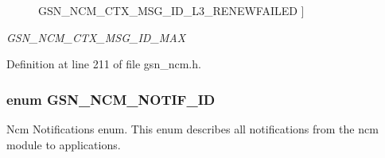 \begin{Desc}
\begin{description}
{\hypertarget{a00688_gga7df8ae3172682e89bfa663208e3f0081a997c45d4f40178db905d5099db419071}{
GSN\_\-NCM\_\-CTX\_\-MSG\_\-ID\_\-L3\_\-RENEWFAILED}
\label{a00688_gga7df8ae3172682e89bfa663208e3f0081a997c45d4f40178db905d5099db419071}
}]\item[{\em 
\hypertarget{a00688_gga7df8ae3172682e89bfa663208e3f0081a69add9c8fa35762c0fc5614ee77eaab3}{
GSN\_\-NCM\_\-CTX\_\-MSG\_\-ID\_\-MAX}
\label{a00688_gga7df8ae3172682e89bfa663208e3f0081a69add9c8fa35762c0fc5614ee77eaab3}
}]\end{description}
\end{Desc}



Definition at line 211 of file gsn\_\-ncm.h.

\hypertarget{a00688_ga9e3bfe0ed58e26633d51d10250743b2a}{
\subsubsection[{GSN\_\-NCM\_\-NOTIF\_\-ID}]{\setlength{\rightskip}{0pt plus 5cm}enum {\bf GSN\_\-NCM\_\-NOTIF\_\-ID}}}
\label{a00688_ga9e3bfe0ed58e26633d51d10250743b2a}


Ncm Notifications enum. This enum describes all notifications from the ncm module to applications. 

